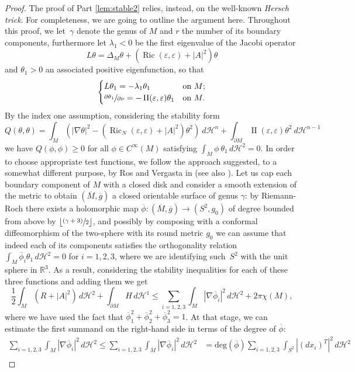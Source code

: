 \documentclass[10pt]{amsart}
\newcounter{cas}
\newcommand{\psfrac}[2]{\sfrac{(#1)}{#2}}
\DeclareMathOperator{\II}{II}
\DeclareMathOperator{\Ric}{Ric}
\theoremstyle{definition}
\newcommand{\R}{\mathbb{R}}
\newcommand{\h}{\mathscr{H}}
\newcommand{\rd}{\ d}
\let\eps\varepsilon
\let\epsilon\eps
\newcommand{\floor}[1]{\lfloor #1 \rfloor}
\begin{document}
\begin{proof}
The proof of Part \eqref{lem:stable2} relies, instead, on the well-known \emph{Hersch trick}. For completeness, we are going to outline the argument here.
Throughout this proof, we let~$\gamma$ denote the genus of $M$ and $r$ the number of its boundary components, furthermore let $\lambda_1<0$ be the first eigenvalue of the Jacobi operator
\[
L\theta=\Delta_{M}\theta + (\Ric(\epsilon,\epsilon)+|A|^2)\theta
\]
and $\theta_1>0$ an associated positive eigenfunction, so that
\[
\begin{cases}
L\theta_1=-\lambda_1\theta_1 & \text{on} \ M;\\
\sfrac{\partial\theta_1}{\partial\nu} =-\II(\epsilon,\epsilon)\theta_1 & \text{on} \ M.
\end{cases}
\]
By the index one assumption, considering the stability form
\[
Q(\theta,\theta)= \int_{M} \left(|\nabla \theta|^2 - (\Ric_N(\epsilon,\epsilon) + |A|^2)\theta^2 \right)\rd\h^{n} + \int_{\partial M}\II(\epsilon,\epsilon)\theta^2 \rd \h^{n-1}
\]
we have $Q(\phi,\phi)\geq 0$ for all $\phi\in C^{\infty}(M)$ satisfying $\int_M \phi ~\theta_1\,d\h^2=0$. In order to choose appropriate test functions, we follow the approach suggested, to a somewhat different purpose, by Ros and Vergasta in \cite{RV95} (see also \cite[Th.\,5.1]{CFP14}). Let us cap each boundary component of $M$ with a closed disk and consider a smooth extension of the metric to obtain $(\overline{M},\overline{g})$ a closed orientable surface of genus $\gamma$: by Riemann-Roch there exists a holomorphic map $\overline{\phi}:(\overline{M},\overline{g})\to(S^2,g_0)$ of degree bounded from above by $\floor{\psfrac{\gamma+3}{2}}$, and possibly by composing with a conformal diffeomorphism of the two-sphere with its round metric $g_0$ we can assume that indeed each of its components satisfies the orthogonality relation $\int_M \overline{\phi}_i \theta_1\,d\h^2=0$ for $i=1,2,3$, where we are identifying such~$S^2$ with the unit sphere in $\R^3$. As a result, considering the stability inequalities for each of these three functions and adding them we get
\[
\frac{1}{2}\int_{M}(R+|A|^2)\,d\h^2+\int_{\partial M}H\,d\h^1\leq \sum_{i=1,2,3} \int_M |\nabla\overline{\phi}_i|^2\,d\h^2+ 2\pi\chi(M),
\]
where we have used the fact that $\overline{\phi}^2_1+\overline{\phi}^2_2+\overline{\phi}^2_3=1$. At that stage, we can estimate the first summand on the right-hand side in terms of the degree of $\overline{\phi}$:
\begin{align*}
\sum_{i=1,2,3} \int_M |\nabla\overline{\phi}_i|^2\,d\h^2\leq \sum_{i=1,2,3} \int_{\overline{M}} |\nabla\overline{\phi}_i|^2\,d\h^2&=\text{deg}(\overline{\phi})\sum_{i=1,2,3}\int_{S^2}|(d x_i)^T|^2\,d\h^2\\

\end{align*}
\end{proof}
\end{document}
